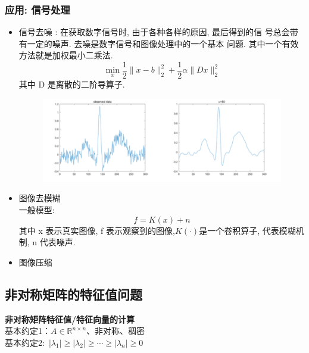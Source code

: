 \documentclass[12pt,a4paper]{article}
\begin{document}
\subsubsection{应用: 信号处理}
\begin{itemize}
	\item 信号去噪 : 在获取数字信号时, 由于各种各样的原因, 最后得到的信 号总会带有一定的噪声. 去噪是数字信号和图像处理中的一个基本 问题. 其中一个有效方法就是加权最小二乘法.
	$$
	\min _{x} \frac{1}{2}\|x-b\|_{2}^{2}+\frac{1}{2} \alpha\|D x\|_{2}^{2}
	$$
	其中 D 是离散的二阶导算子.
	\begin{figure}[htbp]
		\begin{center}
			\includegraphics[scale=1]{figuresl/figure3.png}
		\end{center}
	\end{figure}
	\item 图像去模糊\\
	一般模型:
	$$
	f=K(x)+n
	$$
	其中 x 表示真实图像, f 表示观察到的图像,$K(\cdot)$是一个卷积算子, 代表模糊机制, n 代表噪声.
	\item 图像压缩
\end{itemize}


\subsection{非对称矩阵的特征值问题}
\noindent \textbf{非对称矩阵特征值/特征向量的计算}\\
基本约定1：$A \in \mathbb{R}^{n \times n}$、非对称、稠密\\
基本约定2:~$\left|\lambda_{1}\right| \geq\left|\lambda_{2}\right| \geq \cdots \geq\left|\lambda_{n}\right| \geq 0$\\
\end{document}
